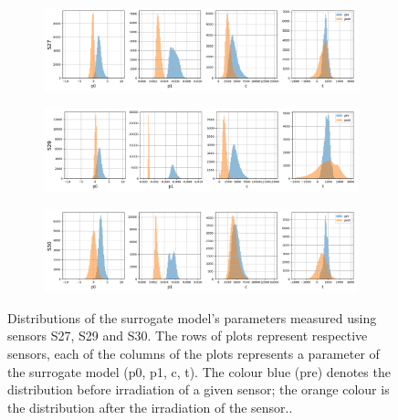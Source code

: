 \begin{figure}[H]
\centering

\begin{subfigure}[b]{1.\textwidth}
    \centering
    \includegraphics[width=\linewidth]{figures/chapter4/surrogates/p1_S27_histos.png}
  \end{subfigure}

\begin{subfigure}[b]{1.\textwidth}
    \centering
    \includegraphics[width=\linewidth]{figures/chapter4/surrogates/p1_S29_histos.png}
  \end{subfigure}

\begin{subfigure}[b]{1.\textwidth}
    \centering
    \includegraphics[width=\linewidth]{figures/chapter4/surrogates/p1_S30_histos.png}
  \end{subfigure}

  \caption[Surrogate parameters distribution part2]{Distributions of the surrogate model's parameters measured using sensors S27, S29 and S30. The rows of plots represent respective sensors, each of the columns of the plots represents a parameter of the surrogate model (p0, p1, c, t).  The colour blue (pre) denotes the distribution before irradiation of a given sensor; the orange colour is the distribution after the irradiation of the sensor..}
\label{plot:sensor_surrogate_p2}
\end{figure}


